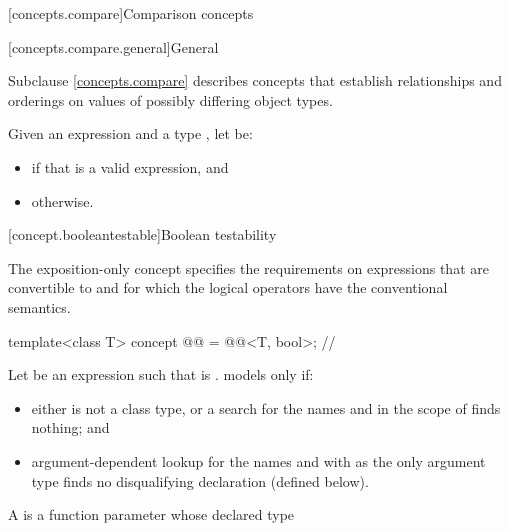 [concepts.compare]{Comparison concepts}

[concepts.compare.general]{General}

\pnum
Subclause \ref{concepts.compare} describes concepts that establish relationships and orderings
on values of possibly differing object types.

\pnum
Given an expression  and a type ,
let  be:
\begin{itemize}
\item
{} if that is a valid expression, and
\item
{} otherwise.
\end{itemize}

[concept.booleantestable]{Boolean testability}

\pnum
The exposition-only  concept
specifies the requirements on expressions
that are convertible to  and
for which the logical operators
have the conventional semantics.

\begin{itemdecl}
template<class T>
  concept @@ = @@<T, bool>;  // \expos
\end{itemdecl}

\pnum
Let  be an expression such that
 is .
 models  only if:

\begin{itemize}
\item
either  is not a class type, or
a search for the names  and 
in the scope of 
finds nothing; and

\item
argument-dependent lookup
for the names  and 
with  as the only argument type
finds no disqualifying declaration (defined below).
\end{itemize}

\pnum
A 
is a function parameter whose declared type 

